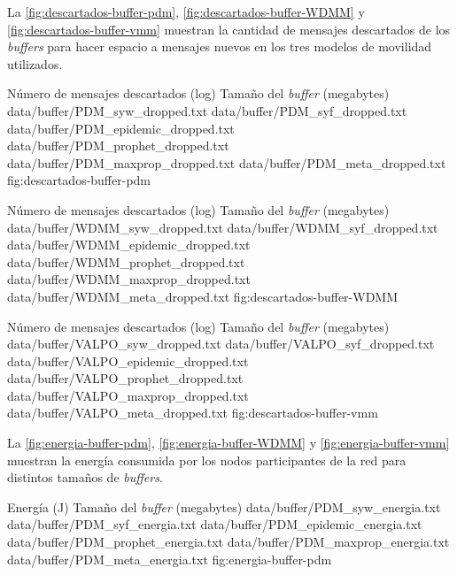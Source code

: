 La \ref{fig:descartados-buffer-pdm},
\ref{fig:descartados-buffer-WDMM} y
\ref{fig:descartados-buffer-vmm} muestran la cantidad de mensajes descartados de
los \textit{buffers} para hacer espacio a mensajes nuevos en los tres modelos de
movilidad utilizados.

{
\graficoProtocolosLog
{Número de mensajes descartados (log)}
{Tamaño del \textit{buffer} (megabytes)} 
{data/buffer/PDM_syw_dropped.txt}
{data/buffer/PDM_syf_dropped.txt}
{data/buffer/PDM_epidemic_dropped.txt}
{data/buffer/PDM_prophet_dropped.txt}
{data/buffer/PDM_maxprop_dropped.txt}
{data/buffer/PDM_meta_dropped.txt}
}{fig:descartados-buffer-pdm}



{
\graficoProtocolosLog
{Número de mensajes descartados (log)}
{Tamaño del \textit{buffer} (megabytes)}
{data/buffer/WDMM_syw_dropped.txt}
{data/buffer/WDMM_syf_dropped.txt}
{data/buffer/WDMM_epidemic_dropped.txt}
{data/buffer/WDMM_prophet_dropped.txt}
{data/buffer/WDMM_maxprop_dropped.txt}
{data/buffer/WDMM_meta_dropped.txt}
}{fig:descartados-buffer-WDMM}



{
\graficoProtocolosLog
{Número de mensajes descartados (log)}
{Tamaño del \textit{buffer} (megabytes)}
{data/buffer/VALPO_syw_dropped.txt}
{data/buffer/VALPO_syf_dropped.txt}
{data/buffer/VALPO_epidemic_dropped.txt}
{data/buffer/VALPO_prophet_dropped.txt}
{data/buffer/VALPO_maxprop_dropped.txt}
{data/buffer/VALPO_meta_dropped.txt}
}{fig:descartados-buffer-vmm}






La \ref{fig:energia-buffer-pdm},
\ref{fig:energia-buffer-WDMM} y 
\ref{fig:energia-buffer-vmm} muestran la energía consumida por los nodos
participantes de la red para distintos tamaños de \textit{buffers}.

{
\graficoProtocolos
{Energía (J)}
{Tamaño del \textit{buffer} (megabytes)} 
{data/buffer/PDM_syw_energia.txt}
{data/buffer/PDM_syf_energia.txt}
{data/buffer/PDM_epidemic_energia.txt}
{data/buffer/PDM_prophet_energia.txt}
{data/buffer/PDM_maxprop_energia.txt}
{data/buffer/PDM_meta_energia.txt}
}{fig:energia-buffer-pdm}



